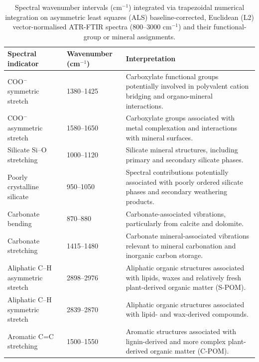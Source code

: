 \documentclass[preprint,12pt]{elsarticle}
\begin{document}
\clearpage

\begin{table}[htbp]
\centering
\caption{Spectral wavenumber intervals (cm$^{-1}$) integrated via trapezoidal numerical integration on asymmetric least squares (ALS) baseline-corrected, Euclidean (L2) vector-normalised ATR-FTIR spectra (800--3000 cm$^{-1}$) and their functional-group or mineral assignments.}
\label{tab:ftir_bands}
\small
\renewcommand{\arraystretch}{1.25}
\begin{tabularx}{\textwidth}{p{3.1cm}p{2.4cm}X}
\hline
\textbf{Spectral indicator} &
\textbf{Wavenumber (cm$^{-1}$)} &
\textbf{Interpretation} \\
\hline

COO$^{-}$ symmetric stretch &
1380--1425 &
Carboxylate functional groups potentially involved in polyvalent cation bridging and organo-mineral interactions. \\

COO$^{-}$ asymmetric stretch &
1580--1650 &
Carboxylate groups associated with metal complexation and interactions with mineral surfaces. \\

Silicate Si--O stretching &
1000--1120 &
Silicate mineral structures, including primary and secondary silicate phases. \\

Poorly crystalline silicate &
950--1050 &
Spectral contributions potentially associated with poorly ordered silicate phases and secondary weathering products. \\

Carbonate bending &
870--880 &
Carbonate-associated vibrations, particularly from calcite and dolomite. \\

Carbonate stretching &
1415--1480 &
Carbonate mineral-associated vibrations relevant to mineral carbonation and inorganic carbon storage. \\

Aliphatic C--H asymmetric stretch &
2898--2976 &
Aliphatic organic structures associated with lipids, waxes and relatively fresh plant-derived organic matter (S-POM). \\

Aliphatic C--H symmetric stretch &
2839--2870 &
Aliphatic organic structures associated with lipid- and wax-derived compounds. \\

Aromatic C=C stretching &
1500--1550 &
Aromatic structures associated with lignin-derived and more complex plant-derived organic matter (C-POM). \\


\end{tabularx}
\end{table}
\end{document}
